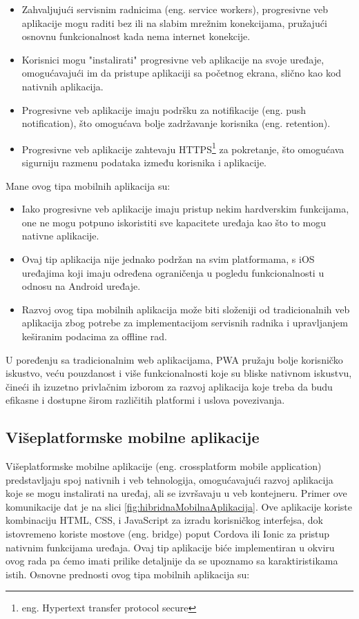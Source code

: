 \documentclass[12pt,oneside]{memoir}
\begin{document}
\begin{itemize}
    \item Zahvaljujući servisnim radnicima\cite{serviceWorkers} (eng. service workers), progresivne veb aplikacije mogu raditi bez ili na slabim mrežnim konekcijama, pružajući osnovnu funkcionalnost kada nema internet konekcije.
    \item Korisnici mogu "instalirati" progresivne veb aplikacije na svoje uređaje, omogućavajući im da pristupe aplikaciji sa početnog ekrana, slično kao kod nativnih aplikacija.
    \item Progresivne veb aplikacije imaju podršku za notifikacije (eng. push notification), što omogućava bolje zadržavanje korisnika (eng. retention).
    \item Progresivne veb aplikacije zahtevaju HTTPS\footnote{eng. Hypertext transfer protocol secure} za pokretanje, što omogućava sigurniju razmenu podataka između korisnika i aplikacije.
\end{itemize}
Mane ovog tipa mobilnih aplikacija su:
\begin{itemize}
    \item Iako progresivne veb aplikacije imaju pristup nekim hardverskim funkcijama, one ne mogu potpuno iskoristiti sve kapacitete uređaja kao što to mogu nativne aplikacije.
    \item Ovaj tip aplikacija nije jednako podržan na svim platformama, s iOS uređajima koji imaju određena ograničenja u pogledu funkcionalnosti u odnosu na Android uređaje.
    \item Razvoj ovog tipa mobilnih aplikacija može biti složeniji od tradicionalnih veb aplikacija zbog potrebe za implementacijom servisnih radnika i upravljanjem keširanim podacima za offline rad.
\end{itemize}

U poređenju sa tradicionalnim web aplikacijama, PWA pružaju bolje korisničko iskustvo, veću pouzdanost i više funkcionalnosti koje su bliske nativnom iskustvu, čineći ih izuzetno privlačnim izborom za razvoj aplikacija koje treba da budu efikasne i dostupne širom različitih platformi i uslova povezivanja.

\subsection{Višeplatformske mobilne aplikacije}

Višeplatformske mobilne aplikacije\cite{crossPlatformApps} (eng. crossplatform mobile application) predstavljaju spoj nativnih i veb tehnologija, omogućavajući razvoj aplikacija koje se mogu instalirati na uređaj, ali se izvršavaju u veb kontejneru. Primer ove komunikacije dat je na slici \ref{fig:hibridnaMobilnaAplikacija}. Ove aplikacije koriste kombinaciju HTML, CSS, i JavaScript za izradu korisničkog interfejsa, dok istovremeno koriste mostove (eng. bridge) poput Cordova ili Ionic\cite{ionicCordova} za pristup nativnim funkcijama uređaja. Ovaj tip aplikacije biće implementiran u okviru ovog rada pa ćemo imati prilike detaljnije da se upoznamo sa karaktiristikama istih. Osnovne prednosti ovog tipa mobilnih aplikacija su:
\end{document}
